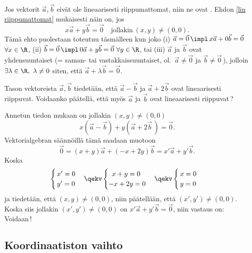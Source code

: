 Jos vektorit $\vec a,\vec b$ eivät ole lineaarisesti riippumattomat, niin ne ovat
%
. Ehdon  \eqref{lin riippumattomat} mukaisesti näin on, jos
\[
x\vec a + y\vec b=\vec 0 \quad \text{jollakin}\ (x,y) \neq (0,0).
\]
Tämä ehto puolestaan toteutuu täsmälleen kun joko
(i) $\vec a = \vec 0 \,\impl\, x\vec a+0\vec b=\vec 0$ $\forall x\in\R$,
(ii) $\vec b = \vec 0 \,\impl\, 0\vec a+y\vec b=\vec 0\ \forall y\in\R$, tai
(iii) $\vec a$ ja $\vec b$ ovat yhdensuuntaiset (= saman- tai vastakkaissuuntaiset, ol.\
$\vec a \neq \vec 0$ ja $\vec b \neq \vec 0\,$), jolloin 
$\exists\lambda\in\R,\ \lambda \neq 0$ siten, että $\vec a + \lambda\vec b = \vec 0$. 
\begin{Exa} Tason vektoreista $\vec a, \vec b$ tiedetään, että $\vec a-\vec b$ ja 
$\vec a+2\vec b$ ovat lineaarisesti riippuvat. Voidaanko päätellä, että myös $\vec a$ ja 
$\vec b$ ovat lineaarisesti riippuvat\,? \end{Exa}
\ratk Annetun tiedon mukaan on jollakin $(x,y) \neq (0,0)$
\[
x(\vec a-\vec b)+y(\vec a+2\vec b\,)=\vec 0.
\]
Vektorialgebran säännöillä tämä saadaan muotoon
\[
\vec 0 = (x+y)\vec a+(-x+2y)\vec b = x'\vec a+y'\vec b.
\]
Koska
\[
\begin{cases} \,x' = 0 \\ \,y' = 0 \end{cases} \qekv \begin{cases} \,\ x+y = 0 \\ -x+2y = 0 
\end{cases} \qekv \begin{cases} \,x =0 \\ \,y = 0 \end{cases}
\]
ja tiedetään, että $(x,y) \neq (0,0)$, niin päätellään, että $(x',y') \neq (0,0)$. Koska siis
jollakin $(x',y') \neq (0,0)$ on $x'\vec a+y'\vec b=\vec 0$, niin vastaus on: Voidaan\,! \loppu

\subsection{Koordinaatiston vaihto}
%

